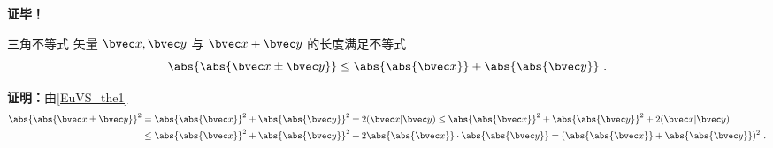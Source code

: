\textbf{证毕！}
\begin{corollary}{三角不等式}\label{EuVS_cor1}
矢量 $\bvec x,\bvec y$ 与 $\bvec x+\bvec y$ 的长度满足不等式
\begin{equation}
\abs{\abs{\bvec x\pm\bvec y}}\leq\abs{\abs{\bvec x}}+\abs{\abs{\bvec y}}~.
\end{equation}
\end{corollary}
\textbf{证明：}由\autoref{EuVS_the1} 
\begin{equation}
\begin{aligned}
\abs{\abs{\bvec x\pm\bvec y}}^2&=\abs{\abs{\bvec x}}^2+\abs{\abs{\bvec y}}^2\pm2(\bvec x|\bvec y)\leq\abs{\abs{\bvec x}}^2+\abs{\abs{\bvec y}}^2+2(\bvec x|\bvec y)\\
&\leq \abs{\abs{\bvec x}}^2+\abs{\abs{\bvec y}}^2+2\abs{\abs{\bvec x}}\cdot\abs{\abs{\bvec y}}=(\abs{\abs{\bvec x}}+\abs{\abs{\bvec y}})^2~.
\end{aligned}
\end{equation}

